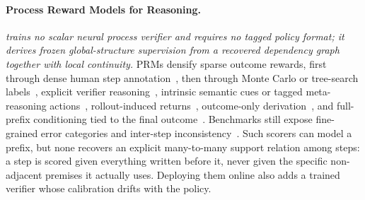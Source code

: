 \paragraph{Process Reward Models for Reasoning.}
\textit{\method trains no scalar neural process verifier and requires no tagged policy format; it derives frozen global-structure supervision from a recovered dependency graph together with local continuity.} PRMs densify sparse outcome rewards, first through dense human step annotation~\citep{uesato2022solving,lightman2023lets}, then through Monte Carlo or tree-search labels~\citep{wang2024math,luo2024omegaprm,zhang2024rest,lu2024autopsv,zhang2025qwen25mathprm,guan2025com}, explicit verifier reasoning~\citep{thinkprm2025,genprm2026,she2025rprm}, intrinsic semantic cues or tagged meta-reasoning actions~\citep{he2026smarter,zhang2026rlvmr}, rollout-induced returns~\citep{setlur2025rewarding,lai2024step}, outcome-only derivation~\citep{yuan2024implicitprm,snell2024com}, and full-prefix conditioning tied to the final outcome~\citep{zhang2026crm}. Benchmarks still expose fine-grained error categories and inter-step inconsistency~\citep{song2025prmbench,zheng2025processbench}. Such scorers can model a prefix, but none recovers an explicit many-to-many support relation among steps: a step is scored given everything written before it, never given the specific non-adjacent premises it actually uses. Deploying them online also adds a trained verifier whose calibration drifts with the policy.

